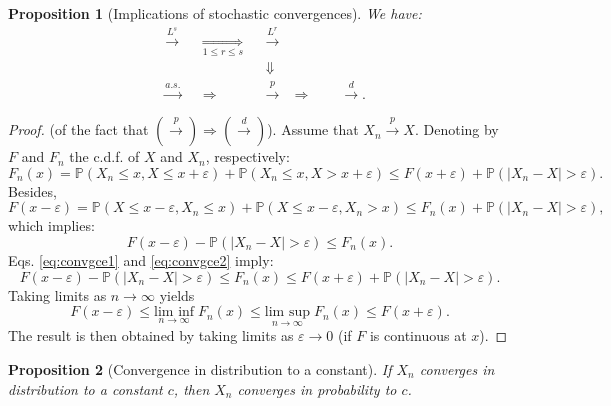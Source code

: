 \documentclass[
  12pt,
]{book}
\newtheorem{proposition}{Proposition}[chapter]
\theoremstyle{definition}
\theoremstyle{definition}
\theoremstyle{definition}
\theoremstyle{definition}
\theoremstyle{remark}
\begin{document}
\begin{proposition}[Implications of stochastic convergences]
\protect\hypertarget{prp:implicationsconv}{}\label{prp:implicationsconv}We have:
\begin{align*}
&\boxed{\overset{L^s}{\rightarrow}}& &\underset{1 \le r \le s}{\Rightarrow}& &\boxed{\overset{L^r}{\rightarrow}}&\\
&& && &\Downarrow&\\
&\boxed{\overset{a.s.}{\rightarrow}}& &\Rightarrow& &\boxed{\overset{p}{\rightarrow}}& \Rightarrow \qquad \boxed{\overset{d}{\rightarrow}}.
\end{align*}
\end{proposition}

\begin{proof}
(of the fact that \(\left(\overset{p}{\rightarrow}\right) \Rightarrow \left( \overset{d}{\rightarrow}\right)\)). Assume that \(X_n \overset{p}{\rightarrow} X\). Denoting by \(F\) and \(F_n\) the c.d.f. of \(X\) and \(X_n\), respectively:
\begin{equation}
F_n(x) = \mathbb{P}(X_n \le x,X\le x+\varepsilon) + \mathbb{P}(X_n \le x,X > x+\varepsilon) \le F(x+\varepsilon) + \mathbb{P}(|X_n - X|>\varepsilon).\label{eq:convgce1}
\end{equation}
Besides,
\[
F(x-\varepsilon) = \mathbb{P}(X \le x-\varepsilon,X_n \le x) + \mathbb{P}(X \le x-\varepsilon,X_n > x) \le F_n(x) + \mathbb{P}(|X_n - X|>\varepsilon),
\]
which implies:
\begin{equation}
F(x-\varepsilon) - \mathbb{P}(|X_n - X|>\varepsilon) \le F_n(x).\label{eq:convgce2}
\end{equation}
Eqs. \eqref{eq:convgce1} and \eqref{eq:convgce2} imply:
\[
F(x-\varepsilon) - \mathbb{P}(|X_n - X|>\varepsilon) \le F_n(x)  \le F(x+\varepsilon) + \mathbb{P}(|X_n - X|>\varepsilon).
\]
Taking limits as \(n \rightarrow \infty\) yields
\[
F(x-\varepsilon) \le \underset{n \rightarrow \infty}{\mbox{lim inf}}\; F_n(x) \le \underset{n \rightarrow \infty}{\mbox{lim sup}}\; F_n(x)  \le F(x+\varepsilon).
\]
The result is then obtained by taking limits as \(\varepsilon \rightarrow 0\) (if \(F\) is continuous at \(x\)).
\end{proof}

\begin{proposition}[Convergence in distribution to a constant]
\protect\hypertarget{prp:cvgce11}{}\label{prp:cvgce11}If \(X_n\) converges in distribution to a constant \(c\), then \(X_n\) converges in probability to \(c\).
\end{proposition}
\end{document}
